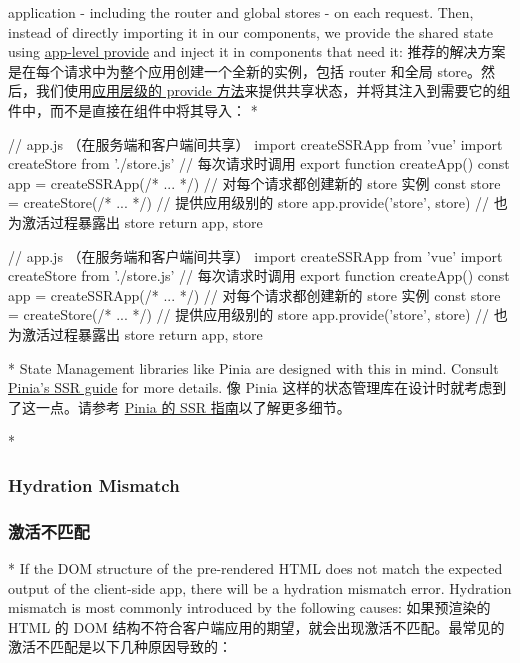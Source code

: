 \begin{paracol}{2}
application - including the router and global stores - on each request.
Then, instead of directly importing it in our components, we provide the
shared state using
\href{https://vuejs.org/guide/components/provide-inject.html\#app-level-provide}{app-level
provide} and inject it in components that need it:
\switchcolumn
推荐的解决方案是在每个请求中为整个应用创建一个全新的实例，包括 router
和全局
store。然后，我们使用\href{https://cn.vuejs.org/guide/components/provide-inject.html\#app-level-provide}{应用层级的
provide
方法}来提供共享状态，并将其注入到需要它的组件中，而不是直接在组件中将其导入：
\switchcolumn[0]*%
\begin{codeJs}
// app.js （在服务端和客户端间共享）
import { createSSRApp } from 'vue'
import { createStore } from './store.js'
// 每次请求时调用
export function createApp() {
  const app = createSSRApp(/* ... */)
  // 对每个请求都创建新的 store 实例
  const store = createStore(/* ... */)
  // 提供应用级别的 store
  app.provide('store', store)
  // 也为激活过程暴露出 store
  return { app, store }
}
\end{codeJs}
\switchcolumn
\begin{codeJs}
// app.js （在服务端和客户端间共享）
import { createSSRApp } from 'vue'
import { createStore } from './store.js'
// 每次请求时调用
export function createApp() {
  const app = createSSRApp(/* ... */)
  // 对每个请求都创建新的 store 实例
  const store = createStore(/* ... */)
  // 提供应用级别的 store
  app.provide('store', store)
  // 也为激活过程暴露出 store
  return { app, store }
}
\end{codeJs}
\switchcolumn[0]*%
State Management libraries like Pinia are designed with this in mind.
Consult \href{https://pinia.vuejs.org/ssr/}{Pinia's SSR guide} for more
details.
\switchcolumn
像 Pinia 这样的状态管理库在设计时就考虑到了这一点。请参考
\href{https://pinia.vuejs.org/zh/ssr/}{Pinia 的 SSR
指南}以了解更多细节。
\end{paracol}


\begin{paracol}{2} 
 
\switchcolumn[0]*%
\subsubsection{Hydration Mismatch}
\switchcolumn
\subsubsection{激活不匹配}
\switchcolumn[0]*%
If the DOM structure of the pre-rendered HTML does not match the
expected output of the client-side app, there will be a hydration
mismatch error. Hydration mismatch is most commonly introduced by the
following causes:
\switchcolumn
如果预渲染的 HTML 的 DOM
结构不符合客户端应用的期望，就会出现激活不匹配。最常见的激活不匹配是以下几种原因导致的：
\end{paracol}





